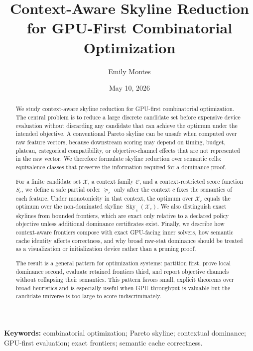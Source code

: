 \documentclass[11pt,oneside]{article}
\title{\vspace{-2.0em}\bfseries Context-Aware Skyline Reduction\\
\large for GPU-First Combinatorial Optimization}
\author{Emily Montes}
\date{May 10, 2026}
\theoremstyle{definition}
\newcommand{\Sky}{\operatorname{Sky}}
\newcommand{\ctx}{\mathcal{C}}
\newcommand{\cand}{\mathcal{X}}
\newcommand{\score}{S}
\begin{document}
\maketitle
\thispagestyle{plain}

\begin{abstract}

We study context-aware skyline reduction for GPU-first combinatorial optimization. The central problem is to reduce a large discrete candidate set before expensive device evaluation without discarding any candidate that can achieve the optimum under the intended objective. A conventional Pareto skyline can be unsafe when computed over raw feature vectors, because downstream scoring may depend on timing, budget, plateau, categorical compatibility, or objective-channel effects that are not represented in the raw vector. We therefore formulate skyline reduction over semantic cells: equivalence classes that preserve the information required for a dominance proof.

For a finite candidate set \(\cand\), a context family \(\ctx\), and a context-restricted score function \(\score_c\), we define a safe partial order \(\succeq_c\) only after the context \(c\) fixes the semantics of each feature. Under monotonicity in that context, the optimum over \(\cand_c\) equals the optimum over the non-dominated skyline \(\Sky_c(\cand_c)\). We also distinguish exact skylines from bounded frontiers, which are exact only relative to a declared policy objective unless additional dominance certificates exist. Finally, we describe how context-aware frontiers compose with exact GPU-facing inner solvers, how semantic cache identity affects correctness, and why broad raw-stat dominance should be treated as a visualization or initialization device rather than a pruning proof.

The result is a general pattern for optimization systems: partition first, prove local dominance second, evaluate retained frontiers third, and report objective channels without collapsing their semantics. This pattern favors small, explicit theorems over broad heuristics and is especially useful when GPU throughput is valuable but the candidate universe is too large to score indiscriminately.
\end{abstract}

\vspace{0.5em}
\noindent\textbf{Keywords:} combinatorial optimization; Pareto skyline; contextual dominance; GPU-first evaluation; exact frontiers; semantic cache correctness.
\end{document}
